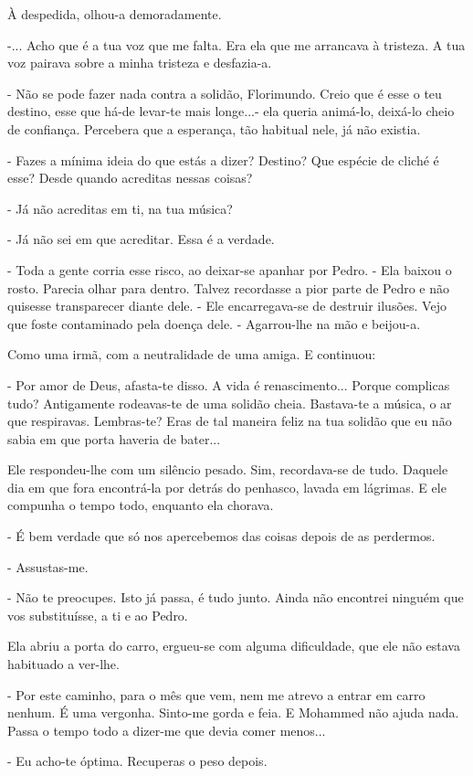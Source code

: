 À despedida, olhou-a demoradamente.

-... Acho que é a tua voz que me falta. Era ela que me arrancava à
tristeza. A tua voz pairava sobre a minha tristeza e desfazia-a.

- Não se pode fazer nada contra a solidão, Florimundo. Creio que é esse
o teu destino, esse que há-de levar-te mais longe...- ela queria
animá-lo, deixá-lo cheio de confiança. Percebera que a esperança, tão
habitual nele, já não existia.

- Fazes a mínima ideia do que estás a dizer? Destino? Que espécie de
cliché é esse? Desde quando acreditas nessas coisas?

- Já não acreditas em ti, na tua música?

- Já não sei em que acreditar. Essa é a verdade.

- Toda a gente corria esse risco, ao deixar-se apanhar por Pedro. - Ela
baixou o rosto. Parecia olhar para dentro. Talvez recordasse a pior
parte de Pedro e não quisesse transparecer diante dele. - Ele
encarregava-se de destruir ilusões. Vejo que foste contaminado pela
doença dele. - Agarrou-lhe na mão e beijou-a.

Como uma irmã, com a neutralidade de uma amiga. E continuou:

- Por amor de Deus, afasta-te disso. A vida é renascimento... Porque
complicas tudo? Antigamente rodeavas-te de uma solidão cheia. Bastava-te
a música, o ar que respiravas. Lembras-te? Eras de tal maneira feliz na
tua solidão que eu não sabia em que porta haveria de bater...

Ele respondeu-lhe com um silêncio pesado. Sim, recordava-se de tudo.
Daquele dia em que fora encontrá-la por detrás do penhasco, lavada em
lágrimas. E ele compunha o tempo todo, enquanto ela chorava.

- É bem verdade que só nos apercebemos das coisas depois de as
perdermos.

- Assustas-me.

- Não te preocupes. Isto já passa, é tudo junto. Ainda não encontrei
ninguém que vos substituísse, a ti e ao Pedro.

Ela abriu a porta do carro, ergueu-se com alguma dificuldade, que ele
não estava habituado a ver-lhe.

- Por este caminho, para o mês que vem, nem me atrevo a entrar em carro
nenhum. É uma vergonha. Sinto-me gorda e feia. E Mohammed não ajuda
nada. Passa o tempo todo a dizer-me que devia comer menos...

- Eu acho-te óptima. Recuperas o peso depois.

